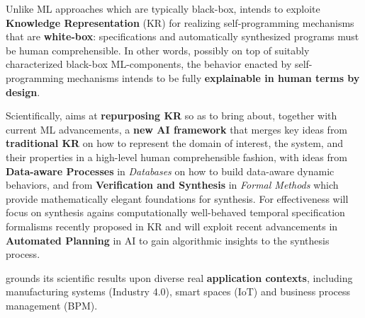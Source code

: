 Unlike ML approaches which are typically black-box, 
\project intends to
exploite \textbf{Knowledge Representation} (KR) for realizing self-programming mechanisms that are
\textbf{white-box}: specifications and automatically synthesized
programs must be human comprehensible. In
other words, possibly on top of suitably characterized black-box 
ML-components, the behavior enacted by \project self-programming
mechanisms intends to be fully \textbf{explainable in human terms by design}.


Scientifically, \project aims at \textbf{repurposing KR} so as to bring about, together with current ML advancements, a
\textbf{new AI framework} that merges key ideas
from \textbf{traditional KR}  on how to represent the domain of interest, the
system, and their properties in a high-level human
comprehensible fashion,
with ideas from \textbf{Data-aware Processes} in \emph{Databases} on how to build data-aware dynamic behaviors,
and from \textbf{Verification and Synthesis} in \emph{Formal Methods}
which provide mathematically elegant foundations for synthesis.  For
 effectiveness \project will focus on synthesis agains
computationally well-behaved temporal specification formalisms
recently proposed in KR
and will exploit recent advancements in \textbf{Automated Planning} in AI to gain
algorithmic insights to the synthesis process.

\project grounds its scientific results upon diverse real
\textbf{application contexts}, including manufacturing systems
(Industry 4.0), smart spaces (IoT) and business process management
(BPM).%

 


